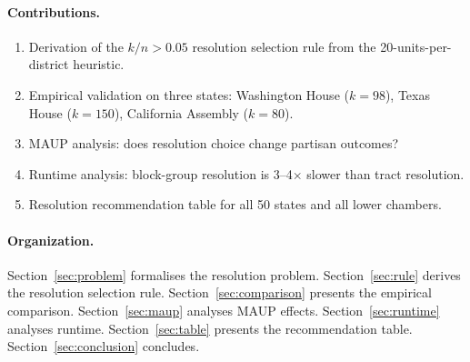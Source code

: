 \paragraph{Contributions.}
\begin{enumerate}
  \item Derivation of the $k/n > 0.05$ resolution selection rule from
    the 20-units-per-district heuristic.
  \item Empirical validation on three states: Washington House ($k=98$),
    Texas House ($k=150$), California Assembly ($k=80$).
  \item MAUP analysis: does resolution choice change partisan outcomes?
  \item Runtime analysis: block-group resolution is 3--4$\times$ slower
    than tract resolution.
  \item Resolution recommendation table for all 50 states and all lower chambers.
\end{enumerate}

\paragraph{Organization.}
Section~\ref{sec:problem} formalises the resolution problem.
Section~\ref{sec:rule} derives the resolution selection rule.
Section~\ref{sec:comparison} presents the empirical comparison.
Section~\ref{sec:maup} analyses MAUP effects.
Section~\ref{sec:runtime} analyses runtime.
Section~\ref{sec:table} presents the recommendation table.
Section~\ref{sec:conclusion} concludes.
